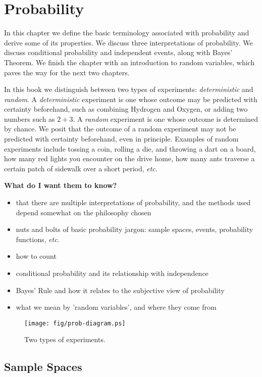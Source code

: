 \chapter{Probability}
\label{sec-4}

\noindent
In this chapter we define the basic terminology associated with
probability and derive some of its properties. We discuss three
interpretations of probability. We discuss conditional probability and
independent events, along with Bayes' Theorem. We finish the chapter
with an introduction to random variables, which paves the way for the
next two chapters.

In this book we distinguish between two types of experiments:
\emph{deterministic} and \emph{random}. A \emph{deterministic} experiment is one
whose outcome may be predicted with certainty beforehand, such as
combining Hydrogen and Oxygen, or adding two numbers such as
\(2+3\). A \emph{random} experiment is one whose outcome is determined by
chance. We posit that the outcome of a random experiment may not be
predicted with certainty beforehand, even in principle. Examples of
random experiments include tossing a coin, rolling a die, and throwing
a dart on a board, how many red lights you encounter on the drive
home, how many ants traverse a certain patch of sidewalk over a short
period, \emph{etc}.

\textbf{What do I want them to know?}
\begin{itemize}
\item that there are multiple interpretations of probability, and the
methods used depend somewhat on the philosophy chosen
\item nuts and bolts of basic probability jargon: sample spaces, events,
probability functions, \emph{etc}.
\item how to count
\item conditional probability and its relationship with independence
\item Bayes' Rule and how it relates to the subjective view of probability
\item what we mean by 'random variables', and where they come from
\end{itemize}

\begin{figure}[ht!]
\centering
\texttt{[image: fig/prob-diagram.ps]}
\caption[Two types of experiments]{\label{fig-diagram}\small Two types of experiments.}
\end{figure}

\section{Sample Spaces}
\label{sec-4-1}

